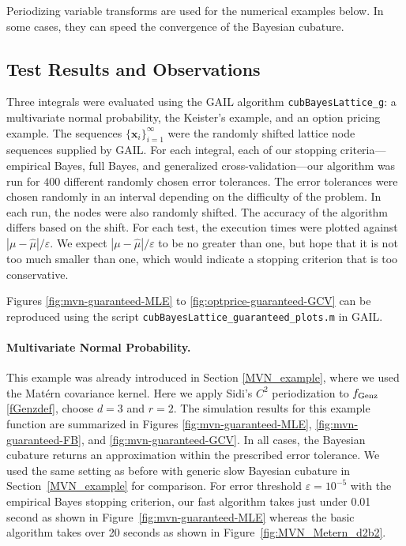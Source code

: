 \documentclass[twocolumn]{svjour3}          %
\newcommand{\bm}[1]{\boldsymbol{#1}}
\newcommand{\vx}{\bm{x}}
\newcommand{\hmu}{\widehat{\mu}}
\newcommand{\code}[1]{\texttt{#1}}
\def\abs#1{\ensuremath{\left \lvert #1 \right \rvert}}
\newcommand\figref{Figure~\ref}
\newcommand\secref{Section~\ref}
\begin{document}
Periodizing variable transforms are used for the numerical examples below. In some cases, they can speed the convergence of the Bayesian cubature. 
	



\subsection{Test Results and Observations}

Three integrals were evaluated using the GAIL algorithm \code{cubBayesLattice\_g}:  a multivariate normal probability, the Keister's example, and an option pricing example.  
The sequences $\{\vx_i\}_{i=1}^\infty$ were the randomly shifted lattice node sequences supplied by GAIL. 
For each integral,  each of our stopping criteria---empirical Bayes, full Bayes, and generalized cross-validation---our algorithm was run for $400$ different randomly chosen error tolerances. The error tolerances were chosen randomly in an interval depending on the difficulty of the problem. In each run, the nodes were also randomly shifted. The accuracy of the algorithm differs based on the shift.
For each test, the execution times were plotted against $\abs{\mu - \hmu}/\varepsilon$.  We expect $\abs{\mu - \hmu}/\varepsilon$ to be no greater than one, but hope that it is not too much smaller than one, which would indicate a stopping criterion that is too conservative. 

Figures \ref{fig:mvn-guaranteed-MLE} to \ref{fig:optprice-guaranteed-GCV} can be reproduced using the script \code{cubBayesLattice\_guaranteed\_plots.m} in GAIL.


\paragraph{Multivariate Normal Probability.}

This example was already introduced in Section \ref{MVN_example}, where we used the Mat\'ern covariance kernel.  Here we apply Sidi's $C^2$  periodization to $ f_{\textup{Genz}}$ \eqref{fGenzdef}, choose $d=3$ and $r=2$. The simulation results for this example function are summarized in Figures \ref{fig:mvn-guaranteed-MLE}, \ref{fig:mvn-guaranteed-FB}, and \ref{fig:mvn-guaranteed-GCV}.  In all cases, the Bayesian cubature returns an approximation within the prescribed error tolerance. We used the same setting as before with generic slow Bayesian cubature in \secref{MVN_example} for comparison. For error threshold $\varepsilon=10^{-5}$ with the empirical Bayes stopping criterion, our fast algorithm takes just under 0.01 second as shown in \figref{fig:mvn-guaranteed-MLE} whereas the basic algorithm takes over 20 seconds as shown in \figref{fig:MVN_Metern_d2b2}. 
\end{document}
